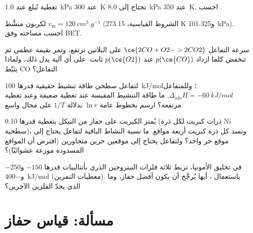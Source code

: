 \begin{exercise}[$\star\star$]\label{exo:b3:surfaces-catalysis:7}
تغطية تُبلغ عند \qty{1.0}{kPa} عند \qty{300}{K} تحتاج إلى \qty{8.0}{kPa} عند \qty{350}{K}. احسب .
\end{exercise}

\begin{exercise}[$\star\star$]\label{exo:b3:surfaces-catalysis:8}
لكربون منشَّط $v_{\mathrm m} = \qty{120}{cm^3.g^{-1}}$ (الشروط القياسية، 273.15 K 
و\qty{101.325}{kPa}). احسب مساحته وفق BET.
\end{exercise}

\begin{exercise}[$\star\star$]\label{exo:b3:surfaces-catalysis:9}
سرعة التفاعل $\ce{2 CO + O2 -> 2 CO2}$ على البلاتين ترتفع، وتمر بقيمة عظمى ثم تنخفض كلما
ازداد $p(\ce{CO})$ عند $p(\ce{O2})$ ثابت. على أي آلية يدل ذلك، ولماذا يثبّط CO
التفاعل؟
\end{exercise}

\begin{exercise}[$\star\star\star$]\label{exo:b3:surfaces-catalysis:10}
لتفاعل سطحي طاقة تنشيط حقيقية قدرها \qty{100}{kJ/mol}؛ وللمتفاعل
$\Delta_{\mathrm{ads}}H = \qty{-60}{kJ/mol}$. ما طاقة التنشيط المقيسة عند تغطية ضعيفة وعند تغطية
مرتفعة؟ ارسم بخطوط عامة $\ln r$ بدلالة $1/T$ على مجال واسع.
\end{exercise}

\begin{exercise}[$\star\star\star$]\label{exo:b3:surfaces-catalysis:11}
يُمتز الكبريت على حفاز من النيكل بتغطية قدرها 0.10 (ذرات كبريت لكل
ذرة Ni سطحية)، وتسد كل ذرة كبريت أربعة مواقع. ما نسبة النشاط
الباقية لتفاعل يحتاج إلى موقع حر واحد؟ ولتفاعل يحتاج إلى موقعين حرين متجاورين (افترض
أن المواقع المسدودة موزعة عشوائيًا)؟
\end{exercise}

\begin{exercise}[$\star\star\star$]\label{exo:b3:surfaces-catalysis:12}
في تخليق الأمونيا، تربط ثلاثة فلزات النيتروجين الذري بأنتالبيات قدرها
$-150$ و$-250$ و\qty{-400}{kJ/mol} (معطيات التمرين). باستعمال ، أيها يُرجَّح أن يكون أفضل حفاز، وما الذي يحدّ الفلزين الآخرين؟
\end{exercise}

\section{مسألة: قياس حفاز}

